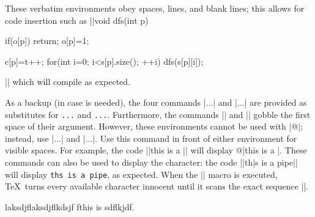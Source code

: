 These verbatim environments obey spaces, lines, and blank lines; this allows for code insertion such as
||void dfs(int p){
    if(o[p]) return;
    o[p]=1;
    
    c[p]=t++;
    for(int i=0; i<s[p].size(); ++i){
        dfs(s[p][i]);
    }
}||
which will compile as expected.

As a backup (in case {\tt\pipe} is needed), the four commands |\bverb...\everb| and |\bverbatim...\everbatim| are provided as substitutes for {\tt\pipe...\pipe} and {\tt\pipe\pipe...\pipe\pipe}. Furthermore, the commands |\bverb| and |\bverbs| gobble the first space of their argument. However, these environments cannot be used with |@|; instead, use |\bverbs...\everbs| and |\bverbatims...\everbatims|. Use this command in front of either environment for visible spaces. For example, the code
||\svs\bverb this is a \test\everb||
will display @|this is a \test|.
These commands can also be used to display the {\tt\pipe} character: the code
||\bverb th|s is a pipe\everb||
will display {\tt th\pipe s is a pipe}, as expected. When the |\bverb| macro is executed, \TeX\ turns every available character innocent until it scans the exact sequence |\everb|.

\bverb laksdjflaksdjflkdsjf fthis is \undefined \bye sdflkjdf\ev@erb. \everb

\bye